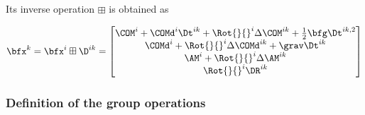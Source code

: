 Its inverse operation $\boxplus$ is obtained as

\begin{equation}
    \bfx^k = \bfx^i \boxplus \D^{ik} =
    \begin{bmatrix}
    \COM^i + \COMd^i \Dt^{ik} + \Rot{}{}^i \Delta \COM^{ik} + \frac{1}{2} \bfg \Dt^{ik,2}
    \\
    \COMd^i + \Rot{}{}^i \Delta \COMd^{ik} + \grav \Dt^{ik}
    \\
    \AM^i + \Rot{}{}^i \Delta \AM^{ik}
    \\
    \Rot{}{}^i \DR^{ik}
    \end{bmatrix}
\end{equation}


\subsubsection{Definition of the group operations}

